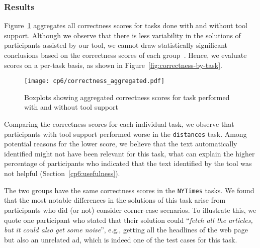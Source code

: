 

\subsubsection{Results}


Figure~\ref{fig:correctness-overall} aggregates all correctness scores for tasks done with and without tool support.
Although we observe that there is less variability in the solutions of participants assisted by our tool,
we cannot draw statistically significant conclusions based on the correctness scores of each group~\cite{Lazar2017-cp3}. 
Hence, we evaluate scores on a per-task basis, as shown in Figure~\ref{fig:correctness-by-task}. 



\medskip
\begin{figure}
    \centering
    \texttt{[image: cp6/correctness\_aggregated.pdf]}
    \caption{Boxplots showing aggregated correctness scores for task performed with and without tool support}
    \label{fig:correctness-overall}
\end{figure}




Comparing the correctness scores for each individual task, we observe that participants with tool support performed worse in the \texttt{distances} task. 
Among potential reasons for the lower score, we believe that the text automatically identified 
might not have been relevant for this task, what can explain the higher percentage of participants
who indicated that the text identified by the tool was not helpful (Section~\ref{cp6:usefulness}).



The two groups have the same correctness scores in the \texttt{NYTimes} tasks.
We found that the most notable differences in the solutions of this task arise from participants who did (or not) consider corner-case scenarios.
To illustrate this, we quote one participant who stated that their solution could ``\textit{fetch all the articles, but it could also get some noise}'',
e.g., getting all the headlines of the web page but also an unrelated ad, which is indeed one of the test cases for this task. 



